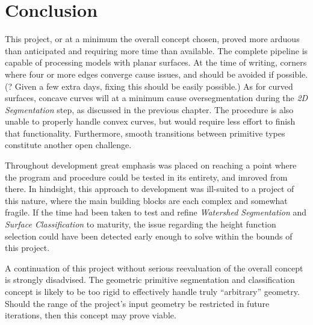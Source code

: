 \chapter{Conclusion}
This project, or at a minimum the overall concept chosen, proved more arduous than anticipated and requiring more time than available.
The complete pipeline is capable of processing models with planar surfaces.
At the time of writing, corners where four or more edges converge cause issues, and should be avoided if possible.
(? Given a few extra days, fixing this should be easily possible.)
As for curved surfaces, concave curves will at a minimum cause oversegmentation during the \textit{2D Segmentation} step, as discussed in the previous chapter.
The procedure is also unable to properly handle convex curves, but would require less effort to finish that functionality.
Furthermore, smooth transitions between primitive types constitute another open challenge.

Throughout development great emphasis was placed on reaching a point where the program and procedure could be tested in its entirety, and imroved from there.
In hindsight, this approach to development was ill-suited to a project of this nature, where the main building blocks are each complex and somewhat fragile.
If the time had been taken to test and refine \textit{Watershed Segmentation} and \textit{Surface Classification} to maturity, the issue regarding the height function selection could have been detected early enough to solve within the bounds of this project.


A continuation of this project without serious reevaluation of the overall concept is strongly disadvised.
The geometric primitive segmentation and classification concept is likely to be too rigid to effectively handle truly ``arbitrary'' geometry.
Should the range of the project's input geometry be restricted in future iterations, then this concept may prove viable.

